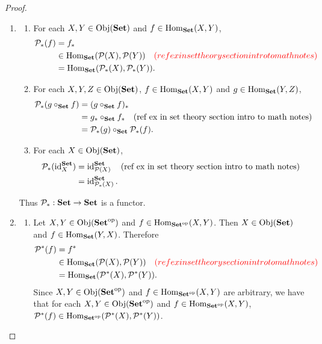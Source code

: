 \documentclass{book}
\begin{document}
\begin{proof}\
	\begin{enumerate}
		\item 
		\begin{enumerate}
			\item For each $X,Y \in \Obj(\bSet)$ and $f \in \Hom_{\bSet}(X,Y)$, 
			\begin{align*}
				\MP_*(f)
				& = f_* \\
				& \in \Hom_{\bSet}(\MP(X), \MP(Y)) \quad \tcr{(ref ex in set theory section intro to math notes)}\\
				& = \Hom_{\bSet}(\MP_*(X), \MP_*(Y)).
			\end{align*}
			\item 
			For each $X,Y,Z \in \Obj(\bSet)$, $f \in \Hom_{\bSet}(X,Y)$ and $g \in \Hom_{\bSet}(Y,Z)$,
			\begin{align*}
				\MP_*(g \circ_{\bSet} f)
				& = (g \circ_{\bSet} f)_* \\
				& = g_* \circ_{\bSet} f_* \quad \text{(ref ex in set theory section intro to math notes)} \\
				& = \MP_*(g) \circ_{\bSet} \MP_*(f).
			\end{align*}
			\item 
			For each $X \in \Obj(\bSet)$, 
			\begin{align*}
				\MP_*(\id_X^{\bSet})
				& = \id_{\MP(X)}^{\bSet} \quad \text{(ref ex in set theory section intro to math notes)} \\
				& = \id_{\MP_*(X)}^{\bSet}.
			\end{align*}
		\end{enumerate}
		Thus $\MP_*: \bSet \rightarrow \bSet$ is a functor.
		\item 
		\begin{enumerate}
			\item Let $X,Y \in \Obj(\op{\bSet})$ and $f \in \Hom_{\op{\bSet}}(X,Y)$. Then $X \in \Obj(\bSet)$ and $f \in \Hom_{\bSet}(Y, X)$. Therefore
			\begin{align*}
				\MP^*(f)
				& = f^* \\
				& \in \Hom_{\bSet}(\MP(X), \MP(Y)) \quad \tcr{(ref ex in set theory section intro to math notes)} \\
				& = \Hom_{\bSet}(\MP^*(X), \MP^*(Y)).
			\end{align*}
			Since $X,Y \in \Obj(\op{\bSet})$ and $f \in \Hom_{\op{\bSet}}(X,Y)$ are arbitrary, we have that for each $X,Y \in \Obj(\op{\bSet})$ and $f \in \Hom_{\op{\bSet}}(X,Y)$, $\MP^*(f) \in \Hom_{\op{\bSet}}(\MP^*(X), \MP^*(Y))$.

\end{enumerate}
\end{enumerate}
\end{proof}
\end{document}
